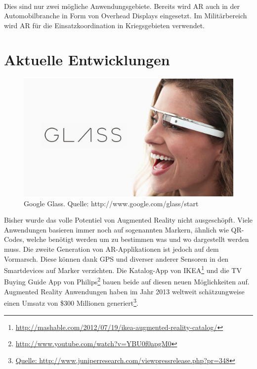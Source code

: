\paragraph{}
Dies sind nur zwei mögliche Anwendungsgebiete. Bereits wird AR auch in der Automobilbranche in Form von Overhead Displays eingesetzt. Im Militärbereich wird AR für die Einsatzkoordination in Kriegsgebieten verwendet.

\section{Aktuelle Entwicklungen}

\begin{figure}[!ht]
\centering
\includegraphics[width=\textwidth]{images/google-glass} 
\caption{Google Glass. Quelle: http://www.google.com/glass/start}
\label{fig:google-glass}
\end{figure}
\noindent
Bisher wurde das volle Potentiel von Augmented Reality nicht ausgeschöpft. Viele Anwendungen basieren immer noch auf sogenannten Markern, ähnlich wie QR-Codes, welche benötigt werden um zu bestimmen was und wo dargestellt werden muss. Die zweite Generation von AR-Applikationen ist jedoch auf dem Vormarsch. Diese können dank GPS und diverser anderer Sensoren in den Smartdevices auf Marker verzichten. Die Katalog-App von IKEA\footnote{\protect\url{http://mashable.com/2012/07/19/ikea-augmented-reality-catalog/}} und die TV Buying Guide App von Philips\footnote{\protect\url{http://www.youtube.com/watch?v=YBU0f0apgM0}} bauen beide auf diesen neuen Möglichkeiten auf. Augmented Reality Anwendungen haben im Jahr 2013 weltweit schätzungweise einen Umsatz von \$300 Millionen generiert\footnote{\protect\url{Quelle: http://www.juniperresearch.com/viewpressrelease.php?pr=348}}.
